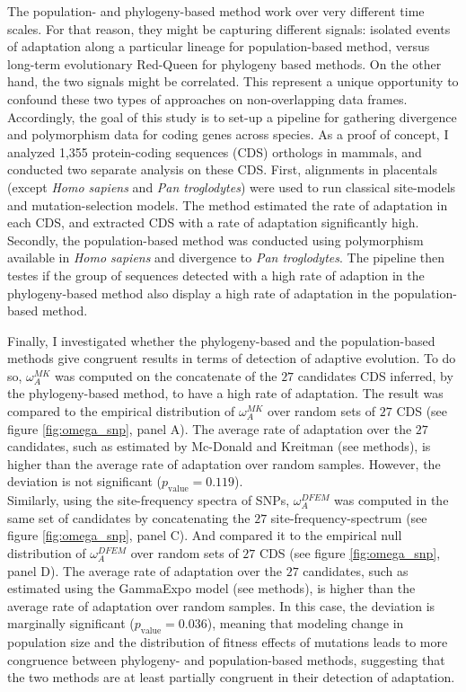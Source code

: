 The population- and phylogeny-based method work over very different time scales.
For that reason, they might be capturing different signals: isolated events of adaptation along a particular lineage for population-based method, versus long-term evolutionary Red-Queen for phylogeny based methods. On the other hand, the two signals might be correlated. This represent a unique opportunity to confound these two types of approaches on non-overlapping data frames. Accordingly, the goal of this study is to set-up a pipeline for gathering divergence and polymorphism data for coding genes across species. As a proof of concept, I analyzed 1,355 protein-coding sequences (CDS) orthologs in mammals, and conducted two separate analysis on these CDS. First, alignments in placentals (except \textit{Homo sapiens} and \textit{Pan troglodytes}) were used to run classical site-models and mutation-selection models. The method estimated the rate of adaptation in each CDS, and extracted CDS with a rate of adaptation significantly high. Secondly, the population-based method was conducted using polymorphism available in \textit{Homo sapiens} and divergence to \textit{Pan troglodytes}. The pipeline then testes if the group of sequences detected with a high rate of adaption in the phylogeny-based method also display a high rate of adaptation in the population-based method.

Finally, I investigated whether the phylogeny-based and the population-based methods give congruent results in terms of detection of adaptive evolution. 
To do so, $\omega_A^{MK}$ was computed on the concatenate of the $27$ candidates CDS inferred, by the phylogeny-based method, to have a high rate of adaptation. The result was compared to the empirical distribution of $\omega_A^{MK}$ over random sets of $27$ CDS (see figure \ref{fig:omega_snp}, panel A).
The average rate of adaptation over the $27$ candidates, such as estimated by Mc-Donald and Kreitman (see methods), is higher than the average rate of adaptation over random samples. However, the deviation is not significant ($p_{\mathrm{value}}=0.119$).\\

Similarly, using the site-frequency spectra of SNPs, $\omega_A^{DFEM}$ was computed in the same set of candidates by concatenating the $27$ site-frequency-spectrum (see figure \ref{fig:omega_snp}, panel C). And compared it to the empirical null distribution of $\omega_A^{DFEM}$ over random sets of $27$ CDS (see figure \ref{fig:omega_snp}, panel D).
The average rate of adaptation over the $27$ candidates, such as estimated using the GammaExpo model (see methods), is higher than the average rate of adaptation over random samples. In this case, the deviation is marginally significant ($p_{\mathrm{value}}=0.036$), 
meaning that modeling change in population size and the distribution of fitness effects of mutations leads to more congruence between phylogeny- and population-based methods, suggesting that the two methods are at least partially congruent in their detection of adaptation.

